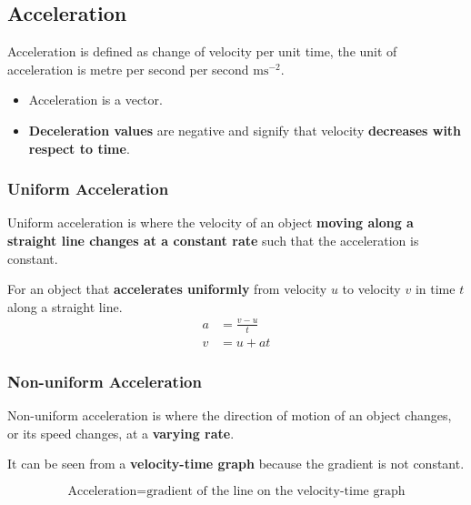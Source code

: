 \subsection{Acceleration}

Acceleration is defined as change of velocity per unit time, the unit of acceleration is metre per second per second $\text{ms}^{-2}$.
\begin{itemize}
    \item Acceleration is a vector.
    \item \textbf{Deceleration values} are negative and signify that velocity \textbf{decreases with respect to time}.
\end{itemize}

\subsubsection*{Uniform Acceleration}

Uniform acceleration is where the velocity of an object \textbf{moving along a straight line changes at a constant rate} such that the acceleration is constant.

For an object that \textbf{accelerates uniformly} from velocity $u$ to velocity $v$ in time $t$ along a straight line.
\begin{align*}
    a&=\frac{v-u}{t}\\
    v&=u+at
\end{align*}

\subsubsection*{Non-uniform Acceleration}

Non-uniform acceleration is where the direction of motion of an object changes, or its speed changes, at a \textbf{varying rate}.

It can be seen from a \textbf{velocity-time graph} because the gradient is not constant.

$$\text{Acceleration}=\text{gradient of the line on the velocity-time graph}$$
